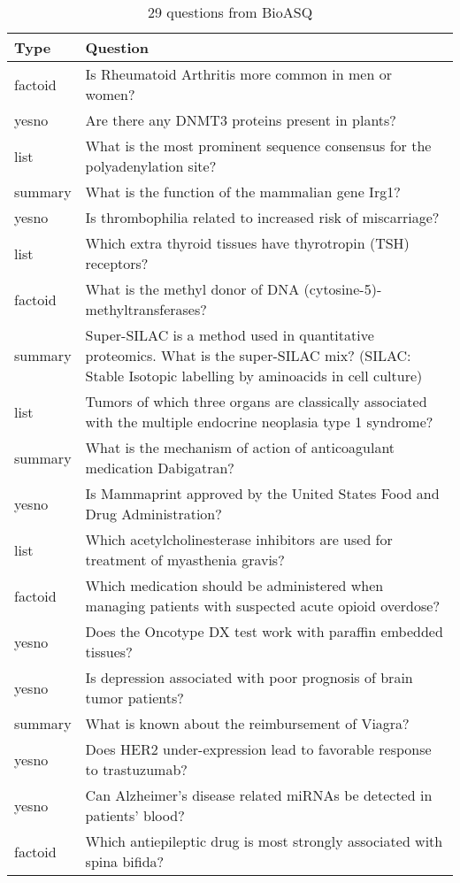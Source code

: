 \begin{table}[h] \centering
\caption{29 questions from BioASQ\label{tab:question}}
\small
\begin{tabular}{lp{32em}}
\hline
Type & Question \\
\hline
factoid & Is Rheumatoid Arthritis more common in men or women? \\
yesno & Are there any DNMT3 proteins present in plants?\\
list & What is the most prominent sequence consensus for the polyadenylation site?\\ 
summary & What is the function of the mammalian gene Irg1?\\  
yesno & Is thrombophilia related to increased risk of miscarriage? \\
list & Which extra thyroid tissues have thyrotropin (TSH) receptors? \\
factoid & What is the methyl donor of DNA (cytosine-5)-methyltransferases?\\ 
summary & Super-SILAC is a method used in quantitative proteomics. What is the super-SILAC mix? (SILAC: Stable Isotopic labelling by aminoacids in cell culture)\\
list & Tumors of which three organs are classically associated with the multiple endocrine neoplasia type 1 syndrome?\\
summary & What is the mechanism of action of anticoagulant medication Dabigatran? \\ 
yesno & Is Mammaprint approved by the United States Food and Drug Administration?\\  
list & Which acetylcholinesterase inhibitors are used for treatment of myasthenia gravis?\\ 
factoid & Which medication should be administered when managing patients with suspected acute opioid overdose?\\       
yesno & Does the Oncotype DX test work with paraffin embedded tissues? \\           
yesno & Is depression associated with poor prognosis of brain tumor patients?\\ 
summary & What is known about the reimbursement of Viagra? \\
yesno & Does HER2 under-expression lead to favorable response to trastuzumab? \\ 
yesno  & Can Alzheimer's disease related miRNAs be detected in patients' blood? \\          
factoid & Which antiepileptic drug is most strongly associated with spina bifida? \\         

\end{tabular}
\end{table}
